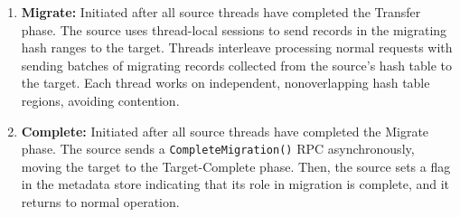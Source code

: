 \begin{enumerate}
\item {\bf Migrate:}
Initiated after all source threads have completed the Transfer phase.
%
The source uses thread-local sessions to send records in the migrating hash ranges
to the target.
%
Threads interleave processing normal requests with sending batches of migrating
records collected from the source's hash table to the target.
%
Each thread works on independent, nonoverlapping hash table regions, avoiding
contention.

\item {\bf Complete:}
Initiated after all source threads have completed the Migrate phase.
%
The source sends a \texttt{CompleteMigration()} RPC asynchronously, moving the target to the Target-Complete phase.
%
Then,
%
the source sets a flag in the metadata store
indicating that its role in migration is complete, and it returns to
normal operation.

\end{enumerate}

